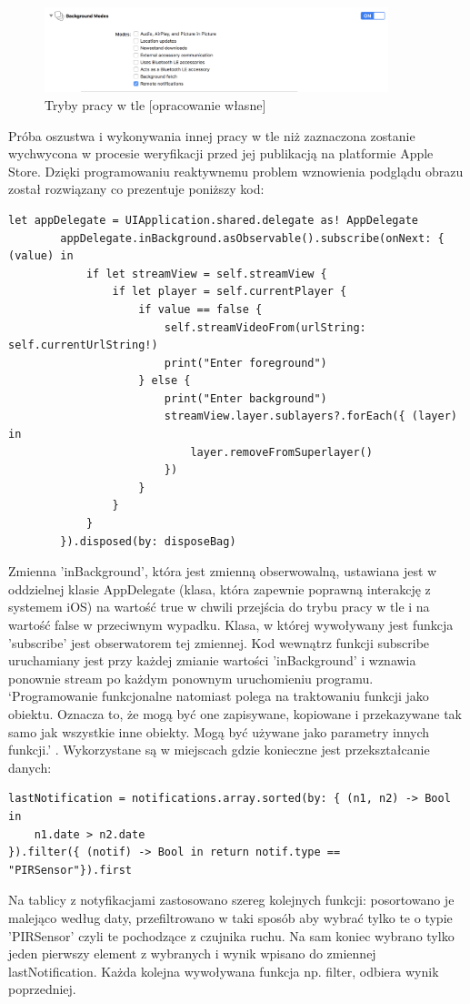 \begin{figure}[H]
	\centering
	\includegraphics[width=10cm]{ios_screenshots/backgroundModes.png}
	\caption{Tryby pracy w tle [opracowanie własne]}
\end{figure}
Próba oszustwa i wykonywania innej pracy w tle niż zaznaczona zostanie wychwycona w procesie weryfikacji przed jej publikacją na platformie Apple Store. Dzięki programowaniu reaktywnemu problem wznowienia podglądu obrazu został rozwiązany co prezentuje poniższy kod:
\begin{verbatim}
let appDelegate = UIApplication.shared.delegate as! AppDelegate
        appDelegate.inBackground.asObservable().subscribe(onNext: { (value) in
            if let streamView = self.streamView {
                if let player = self.currentPlayer {
                    if value == false {
                        self.streamVideoFrom(urlString: self.currentUrlString!)
                        print("Enter foreground")
                    } else {
                        print("Enter background")
                        streamView.layer.sublayers?.forEach({ (layer) in
                            layer.removeFromSuperlayer()
                        })
                    }
                }
            }
        }).disposed(by: disposeBag)
\end{verbatim}
Zmienna 'inBackground', która jest zmienną obserwowalną, ustawiana jest w oddzielnej klasie AppDelegate (klasa, która zapewnie poprawną interakcję z systemem iOS) na wartość true w chwili przejścia do trybu pracy w tle i na wartość false w przeciwnym wypadku. Klasa, w której wywoływany jest funkcja 'subscribe' jest obserwatorem tej zmiennej. Kod wewnątrz funkcji subscribe uruchamiany jest przy każdej zmianie wartości 'inBackground' i wznawia ponownie stream po każdym ponownym uruchomieniu programu.
`Programowanie funkcjonalne natomiast polega na traktowaniu funkcji jako obiektu. Oznacza to, że mogą być one zapisywane, kopiowane i przekazywane tak samo jak wszystkie inne obiekty. Mogą być używane jako parametry innych funkcji.' \cite[p.~172]{proswift}. Wykorzystane są w miejscach gdzie konieczne jest przekształcanie danych:
\begin{verbatim}
lastNotification = notifications.array.sorted(by: { (n1, n2) -> Bool in
	n1.date > n2.date 
}).filter({ (notif) -> Bool in return notif.type == "PIRSensor"}).first
\end{verbatim}
Na tablicy z notyfikacjami zastosowano szereg kolejnych funkcji: posortowano je malejąco według daty, przefiltrowano w taki sposób aby wybrać tylko te o typie 'PIRSensor' czyli te pochodzące z czujnika ruchu. Na sam koniec wybrano tylko jeden pierwszy element z wybranych i wynik wpisano do zmiennej lastNotification. Każda kolejna wywoływana funkcja np. filter, odbiera wynik poprzedniej. 

